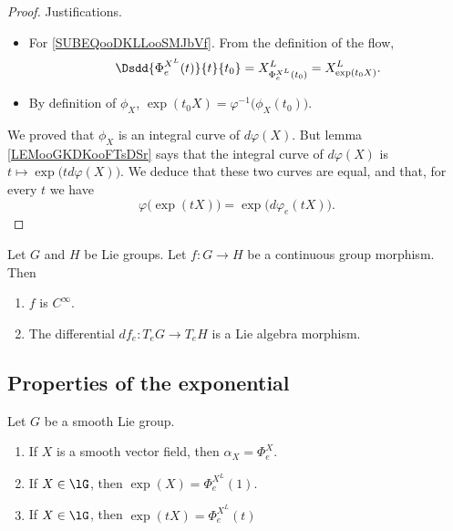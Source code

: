 \begin{proof}
	Justifications.
	\begin{itemize}
		\item For \eqref{SUBEQooDKLLooSMJbVf}. From the definition of the flow,
		      \begin{equation}
			      \Dsdd{ \Phi_e^{X^L}(t) }{t}{t_0}=X^{L}_{\Phi^{X^L}_e(t_0)}=X^L_{\exp(t_0X)}.
		      \end{equation}
		\item
		      By definition of \( \phi_X\), \( \exp(t_0X)=\varphi^{-1}\big( \phi_X(t_0) \big)\).
	\end{itemize}
	We proved that \( \phi_X\) is an integral curve of \( d\varphi(X)\). But lemma \ref{LEMooGKDKooFTsDSr} says that the integral curve of \( d\varphi(X)\) is \( t\mapsto \exp\big( td\varphi(X) \big)\). We deduce that these two curves are equal, and that, for every \( t\) we have
	\begin{equation}
		\varphi\big( \exp(tX) \big)=\exp\big( d\varphi_e(tX) \big).
	\end{equation}
\end{proof}


\begin{theorem}	\label{THOooSQNPooHMJluB}
	Let \( G\) and \( H\) be Lie groups. Let \(f \colon G\to  H  \) be a continuous group morphism. Then
	\begin{enumerate}
		\item
		      \( f\) is \( C^{\infty}\).
		\item
		      The differential \(df_e \colon T_eG\to T_eH  \) is a Lie algebra morphism.
	\end{enumerate}
\end{theorem}


\subsection{Properties of the exponential}


\begin{proposition}	\label{PROPooPEFPooFvpxTe}
	Let \(  G\) be a smooth Lie group.
	\begin{enumerate}
		\item		\label{ITEMooKSGJooHdaZcR}
		      If \( X\) is a smooth vector field, then \( \alpha_X=\Phi_e^X \).
		\item		\label{ITEMooAFTTooHpaeJi}
		      If \( X\in \lG\), then \( \exp(X)=\Phi_e^{X^L}(1)\).
		\item	\label{ITEMooXRHDooTlrTYA}
		      If \( X\in\lG\), then \( \exp(tX)=\Phi_e^{X^L}(t)\)
	\end{enumerate}
\end{proposition}

